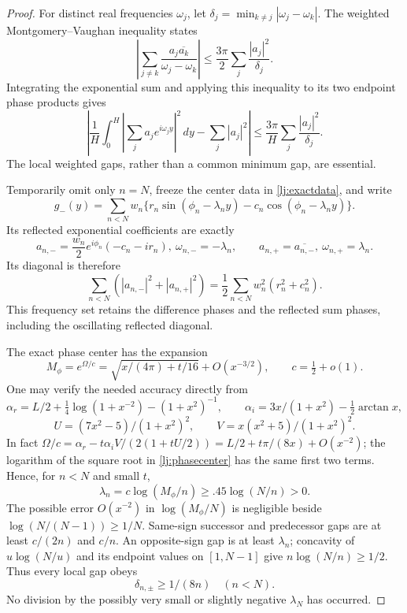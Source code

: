 \documentclass[11pt]{article}
\numberwithin{equation}{section}
\theoremstyle{definition}
\theoremstyle{remark}
\newcommand{\dd}{\,d}
\begin{document}
\begin{proof}
For distinct real frequencies \(\omega_j\), let
\(\delta_j=\min_{k\ne j}|\omega_j-\omega_k|\).
The weighted Montgomery--Vaughan inequality
\cite[Theorem 2, equation (1.7), and Corollary 2, equation (1.9)]
{montgomeryvaughan} states
\[
 \left|\sum_{j\ne k}\frac{a_j\overline{a_k}}{\omega_j-\omega_k}\right|
 \le\frac{3\pi}{2}\sum_j\frac{|a_j|^2}{\delta_j}.
\]
Integrating the exponential sum and applying this inequality to its two
endpoint phase products gives
\begin{equation}\label{lj:hilbertaverage}
 \left|\frac1H\int_0^H\left|\sum_ja_je^{i\omega_jy}\right|^2\dd y
                     -\sum_j|a_j|^2\right|
 \le\frac{3\pi}{H}\sum_j\frac{|a_j|^2}{\delta_j}.
\end{equation}
The local weighted gaps, rather than a common minimum gap, are essential.

Temporarily omit only \(n=N\), freeze the center data in
\eqref{lj:exactdata}, and write
\[
 g_-(y)=\sum_{n<N}w_n
       \{r_n\sin(\phi_n-\lambda_ny)-c_n\cos(\phi_n-\lambda_ny)\}.
\]
Its reflected exponential coefficients are exactly
\[
 a_{n,-}=\frac{w_n}{2}e^{i\phi_n}(-c_n-ir_n),\
 \omega_{n,-}=-\lambda_n,\qquad
 a_{n,+}=\overline{a_{n,-}},\
 \omega_{n,+}=\lambda_n.
\]
Its diagonal is therefore
\begin{equation}\label{lj:reflecteddiagonal}
 \sum_{n<N}(|a_{n,-}|^2+|a_{n,+}|^2)
             =\frac12\sum_{n<N}w_n^2(r_n^2+c_n^2).
\end{equation}
This frequency set retains the difference phases and the reflected sum
phases, including the oscillating reflected diagonal.

The exact phase center has the expansion
\begin{equation}\label{lj:phasecenter}
 M_\phi=e^{\Omega/c}
       =\sqrt{x/(4\pi)+t/16}+O(x^{-3/2}),\qquad c=\tfrac12+o(1).
\end{equation}
One may verify the needed accuracy directly from
\[
 \alpha_r=L/2+\tfrac14\log(1+x^{-2})-(1+x^2)^{-1},\qquad
 \alpha_i=3x/(1+x^2)-\tfrac12\arctan x,
\]
\[
 U=(7x^2-5)/(1+x^2)^2,\qquad V=x(x^2+5)/(1+x^2)^2.
\]
In fact \(\Omega/c=\alpha_r-t\alpha_iV/(2(1+tU/2))
=L/2+t\pi/(8x)+O(x^{-2})\);
the logarithm of the square root in \eqref{lj:phasecenter} has the same
first two terms. Hence, for \(n<N\) and small \(t\),
\[
 \lambda_n=c\log(M_\phi/n)\ge.45\log(N/n)>0.
\]
The possible error \(O(x^{-2})\) in \(\log(M_\phi/N)\) is negligible
beside \(\log(N/(N-1))\ge1/N\).
Same-sign successor and predecessor gaps are at least \(c/(2n)\)
and \(c/n\). An opposite-sign gap is at least \(\lambda_n\);
concavity of \(u\log(N/u)\) and its endpoint values on \([1,N-1]\)
give \(n\log(N/n)\ge1/2\). Thus every local gap obeys
\begin{equation}\label{lj:localgaps}
 \delta_{n,\pm}\ge1/(8n)\quad(n<N).
\end{equation}
No division by the possibly very small or slightly negative
\(\lambda_N\) has occurred.


\end{proof}
\end{document}
